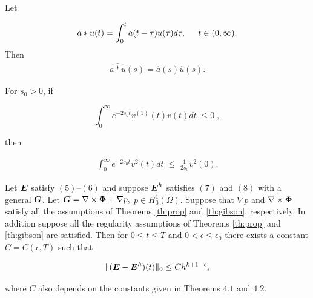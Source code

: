 \documentclass[final,leqno,onetabnum]{siamltex0315}
\def\bfE{\mbox{\boldmath$E$}}
\def\bfG{\mbox{\boldmath$G$}}
\begin{document}
 
\begin{proposition}
\label{pro:2.1}  Let
\begin{linenomath*}
\begin{eqnarray*}
a\ast u(t) = \int_0^t a(t- \tau) u(\tau) d\tau, \hspace{.2in} t \in
(0, \infty).
\end{eqnarray*}
Then
\begin{eqnarray*}
\widehat{a\ast u}(s) = \widehat{a}(s)\widehat{u}(s).
\end{eqnarray*}
\end{linenomath*}
\end{proposition}

\begin{lemma}
\label{lem:3.1}
For $s_0 >0$, if
\begin{linenomath*}
$$
\int_0^{\infty} e^{-2s_0 t}v^{(1)}(t) v(t) dt \; \leq 0 \;,
$$
\end{linenomath*}
then
\begin{linenomath*}
\begin{eqnarray*}
\int_0^{\infty} e^{-2s_0 t} v^2(t) dt \; \leq \; \frac{1}{2s_0} v^2(0).
\end{eqnarray*}
\end{linenomath*}
\end{lemma}

\begin{corollary}\label{c4.1}
Let $ \bfE $ satisfy $(5)$--$(6)$ and
suppose $ \bfE^h $ satisfies $(7)$ and $(8)$
with a general $ \bfG $.  Let $ \bfG= \nabla \times {\bf \Phi} + \nabla p,$
$p \in H_0^1 (\Omega) $. Suppose that $\nabla p$ and $ \nabla \times 
{\bf \Phi} $ satisfy all the assumptions of Theorems {\rm \ref{th:prop}} and  
{\rm \ref{th:gibson}}, respectively. In addition suppose all the regularity
assumptions of Theorems {\rm \ref{th:prop}} and  
{\rm \ref{th:gibson}} are satisfied.  Then 
for $ 0 \le t \le T $ and $ 0 < \epsilon \le \epsilon_0 $ there exists a 
constant $ C = C(\epsilon, T) $ such that
\begin{linenomath*}
$$
\Vert (\bfE - \bfE^h)(t) \Vert_0 \le C h^{k+1- \epsilon},
$$
\end{linenomath*}
where $ C $ also depends on the constants given in Theorems 
$4.1$ and $4.2$.
\end{corollary}
\end{document}
